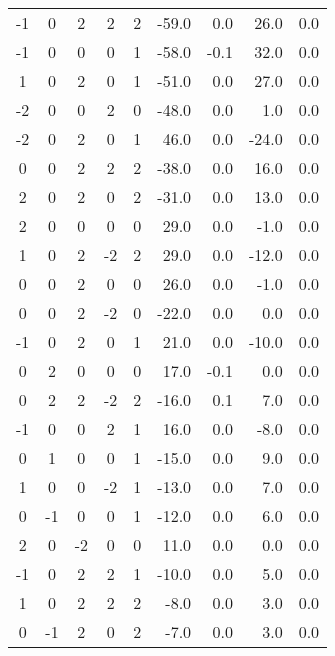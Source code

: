 \begin{center}
{\begin{xtabular}{|ccccc|rr|rr|}
 -1 &  0 &  2 &  2 &  2 &     -59.0  &      0.0  &     26.0   &     0.0     \\
 -1 &  0 &  0 &  0 &  1 &     -58.0  &     -0.1  &     32.0   &     0.0     \\
  1 &  0 &  2 &  0 &  1 &     -51.0  &      0.0  &     27.0   &     0.0     \\
 -2 &  0 &  0 &  2 &  0 &     -48.0  &      0.0  &      1.0   &     0.0     \\
 -2 &  0 &  2 &  0 &  1 &      46.0  &      0.0  &    -24.0   &     0.0     \\
  0 &  0 &  2 &  2 &  2 &     -38.0  &      0.0  &     16.0   &     0.0     \\
  2 &  0 &  2 &  0 &  2 &     -31.0  &      0.0  &     13.0   &     0.0     \\
  2 &  0 &  0 &  0 &  0 &      29.0  &      0.0  &     -1.0   &     0.0     \\
  1 &  0 &  2 & -2 &  2 &      29.0  &      0.0  &    -12.0   &     0.0     \\
  0 &  0 &  2 &  0 &  0 &      26.0  &      0.0  &     -1.0   &     0.0     \\
  0 &  0 &  2 & -2 &  0 &     -22.0  &      0.0  &      0.0   &     0.0     \\
 -1 &  0 &  2 &  0 &  1 &      21.0  &      0.0  &    -10.0   &     0.0     \\
  0 &  2 &  0 &  0 &  0 &      17.0  &     -0.1  &      0.0   &     0.0     \\
  0 &  2 &  2 & -2 &  2 &     -16.0  &      0.1  &      7.0   &     0.0     \\
 -1 &  0 &  0 &  2 &  1 &      16.0  &      0.0  &     -8.0   &     0.0     \\
  0 &  1 &  0 &  0 &  1 &     -15.0  &      0.0  &      9.0   &     0.0     \\
  1 &  0 &  0 & -2 &  1 &     -13.0  &      0.0  &      7.0   &     0.0     \\
  0 & -1 &  0 &  0 &  1 &     -12.0  &      0.0  &      6.0   &     0.0     \\
  2 &  0 & -2 &  0 &  0 &      11.0  &      0.0  &      0.0   &     0.0     \\
 -1 &  0 &  2 &  2 &  1 &     -10.0  &      0.0  &      5.0   &     0.0     \\
  1 &  0 &  2 &  2 &  2 &      -8.0  &      0.0  &      3.0   &     0.0     \\
  0 & -1 &  2 &  0 &  2 &      -7.0  &      0.0  &      3.0   &     0.0     \\

\end{xtabular}}
\end{center}
